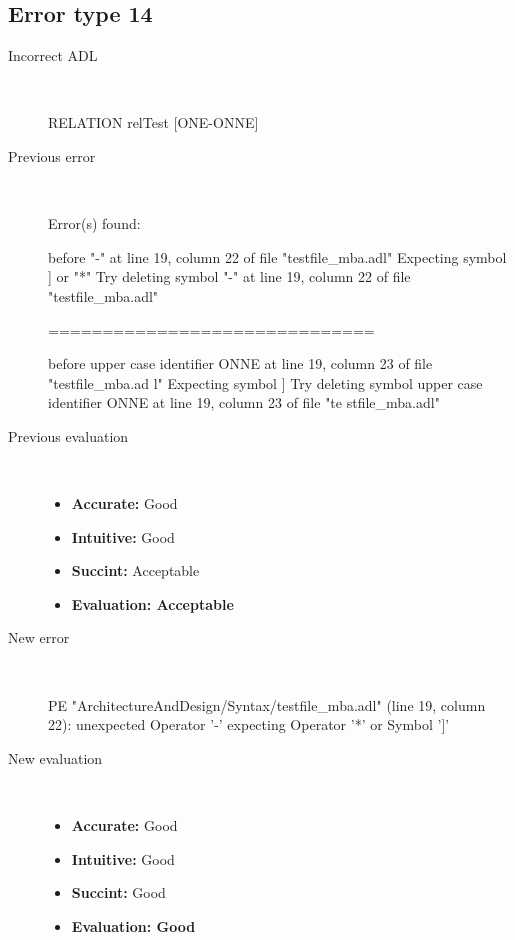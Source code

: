 \hrulefill

\subsection{Error type 14}
  \begin{description}
  \item[Incorrect ADL]~\\
\begin{adl}
RELATION relTest [ONE-ONNE]\end{adl}
  \item[Previous error]~\\
\begin{haskell}
Error(s) found:

before "-" at line 19, column 22 of file "testfile_mba.adl"
Expecting symbol ] or "*"
Try deleting symbol "-" at line 19, column 22 of file "testfile_mba.adl"

==============================

before upper case identifier ONNE at line 19, column 23 of file "testfile_mba.ad
l"
Expecting symbol ]
Try deleting symbol upper case identifier ONNE at line 19, column 23 of file "te
stfile_mba.adl"\end{haskell}
  \item[Previous evaluation]~\\
    \begin{itemize}
    \item \textbf{Accurate:} Good
    \item \textbf{Intuitive:} Good
    \item \textbf{Succint:} Acceptable
    \item \textbf{Evaluation: Acceptable}
    \end{itemize}
  \item[New error]~\\
\begin{haskell}
PE "ArchitectureAndDesign/Syntax/testfile_mba.adl" (line 19, column 22):
unexpected Operator '-'
expecting Operator '*' or Symbol ']'\end{haskell}
  \item[New evaluation]~\\
    \begin{itemize}
    \item \textbf{Accurate:} Good
    \item \textbf{Intuitive:} Good
    \item \textbf{Succint:} Good
    \item \textbf{Evaluation: Good
}
    \end{itemize}
  \end{description}


